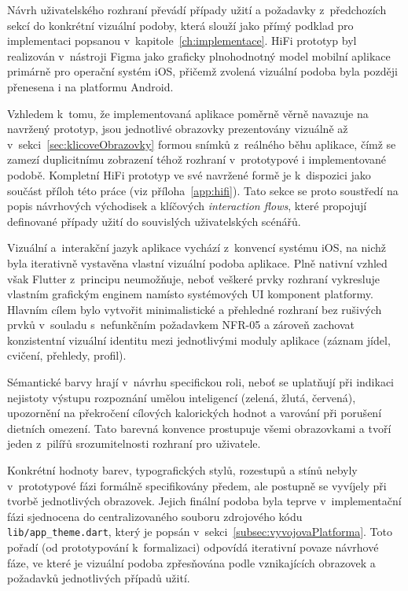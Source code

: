 Návrh uživatelského rozhraní převádí případy užití a požadavky z~předchozích sekcí do konkrétní vizuální podoby, která slouží jako přímý podklad pro implementaci popsanou v~kapitole~\ref{ch:implementace}.
HiFi prototyp byl realizován v~nástroji Figma jako graficky plnohodnotný model mobilní aplikace primárně pro operační systém iOS, přičemž zvolená vizuální podoba byla později přenesena i na platformu Android.

Vzhledem k~tomu, že implementovaná aplikace poměrně věrně navazuje na navržený prototyp, jsou jednotlivé obrazovky prezentovány vizuálně až v~sekci~\ref{sec:klicoveObrazovky} formou snímků z~reálného běhu aplikace, čímž se zamezí duplicitnímu zobrazení téhož rozhraní v~prototypové i implementované podobě.
Kompletní HiFi prototyp ve své navržené formě je k~dispozici jako součást příloh této práce (viz příloha~\ref{app:hifi}).
Tato sekce se proto soustředí na popis návrhových východisek a klíčových \emph{interaction flows}, které propojují definované případy užití do souvislých uživatelských scénářů.

Vizuální a~interakční jazyk aplikace vychází z~konvencí systému iOS, na nichž byla iterativně vystavěna vlastní vizuální podoba aplikace.
Plně nativní vzhled však Flutter z~principu neumožňuje, neboť veškeré prvky rozhraní vykresluje vlastním grafickým enginem namísto systémových UI komponent platformy.
Hlavním cílem bylo vytvořit minimalistické a přehledné rozhraní bez rušivých prvků v~souladu s~nefunkčním požadavkem NFR-05 a zároveň zachovat konzistentní vizuální identitu mezi jednotlivými moduly aplikace (záznam jídel, cvičení, přehledy, profil).

Sémantické barvy hrají v~návrhu specifickou roli, neboť se uplatňují při indikaci nejistoty výstupu rozpoznání umělou inteligencí (zelená, žlutá, červená), upozornění na překročení cílových kalorických hodnot a varování při porušení dietních omezení.
Tato barevná konvence prostupuje všemi obrazovkami a tvoří jeden z~pilířů srozumitelnosti rozhraní pro uživatele.

Konkrétní hodnoty barev, typografických stylů, rozestupů a stínů nebyly v~prototypové fázi formálně specifikovány předem, ale postupně se vyvíjely při tvorbě jednotlivých obrazovek.
Jejich finální podoba byla teprve v~implementační fázi sjednocena do centralizovaného souboru zdrojového kódu \texttt{lib/app\_theme.dart}, který je popsán v~sekci~\ref{subsec:vyvojovaPlatforma}.
Toto pořadí (od prototypování k~formalizaci) odpovídá iterativní povaze návrhové fáze, ve které je vizuální podoba zpřesňována podle vznikajících obrazovek a požadavků jednotlivých případů užití.

